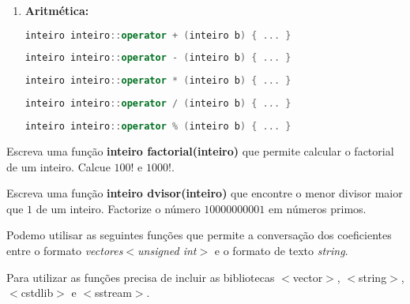 \begin{enumerate}
\item \setlength{\leftskip}{4mm} {\bf Aritmética:}
\begin{lstlisting}[language=C++]
inteiro inteiro::operator + (inteiro b) { ... }
\end{lstlisting}
\begin{lstlisting}[language=C++]
inteiro inteiro::operator - (inteiro b) { ... }
\end{lstlisting}
\begin{lstlisting}[language=C++]
inteiro inteiro::operator * (inteiro b) { ... }
\end{lstlisting}
\begin{lstlisting}[language=C++]
inteiro inteiro::operator / (inteiro b) { ... }
\end{lstlisting}
\begin{lstlisting}[language=C++]
inteiro inteiro::operator % (inteiro b) { ... }
\end{lstlisting}
\end{enumerate}


\nextexer{} Escreva uma função {\bf inteiro factorial(inteiro)} que permite calcular o factorial de um inteiro. Calcue $100!$ e $1000!$.

\nextexer{} Escreva uma função {\bf inteiro dvisor(inteiro)} que encontre o menor divisor maior que $1$ de um inteiro. Factorize o número $10000000001$ em números primos.
\newpage



Podemo utilisar as seguintes funções que permite a conversação dos coeficientes entre o formato {\it vectores$<$unsigned int$>$} e o formato de texto {\it string}.

Para utilizar as funções precisa de incluir as bibliotecas $<$vector$>$, $<$string$>$, $<$cstdlib$>$ e $<$sstream$>$.

